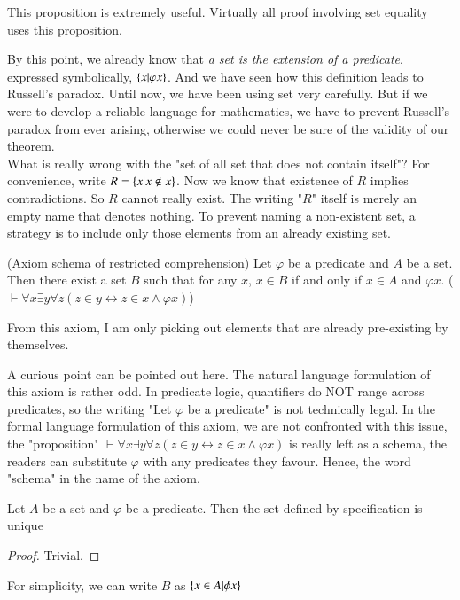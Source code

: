 \begin{rem}
    This proposition is extremely useful. Virtually all proof involving set equality uses this proposition.
\end{rem}
By this point, we already know that \textit{a set is the extension of a predicate}, expressed symbolically, $\{x|\varphi x\}$. And we have seen how this definition leads to Russell's paradox. Until now, we have been using set very carefully. But if we were to develop a reliable language for mathematics, we have to prevent Russell's paradox from ever arising, otherwise we could never be sure of the validity of our theorem.\\
What is really wrong with the "set of all set that does not contain itself"? For convenience, write $R = \{x|x\not\in x\}$. Now we know that existence of $R$ implies contradictions. So $R$ cannot really exist. The writing "$R$" itself is merely an empty name that denotes nothing. To prevent naming a non-existent set, a strategy is to include only those elements from an already existing set. 
\begin{ax}
    (Axiom schema of restricted comprehension) Let $\varphi$ be a predicate and $A$ be a set. Then there exist a set $B$ such that for any $x$, $x\in B$ if and only if $x\in A$ and $\varphi x$. ($\vdash \forall x\exists y\forall z(z\in y\leftrightarrow z\in x\wedge \varphi x)$)
\end{ax}
From this axiom, I am only picking out elements that are already pre-existing by themselves.  
\begin{rem}
    A curious point can be pointed out here. The natural language formulation of this axiom is rather odd. In predicate logic, quantifiers do NOT range across predicates, so the writing "Let $\varphi$ be a predicate" is not technically legal. In the formal language formulation of this axiom, we are not confronted with this issue, the "proposition" $\vdash \forall x\exists y\forall z(z\in y\leftrightarrow z\in x\wedge \varphi x)$ is really left as a schema, the readers can substitute $\varphi$ with any predicates they favour. Hence, the word "schema" in the name of the axiom.
\end{rem}
\begin{prop}
    Let $A$ be a set and $\varphi$ be a predicate. Then the set defined by specification is unique
\end{prop}
\begin{proof}
    Trivial.
\end{proof}
\begin{rem}
    For simplicity, we can write $B$ as $\{x\in A|\phi x\}$
\end{rem}
